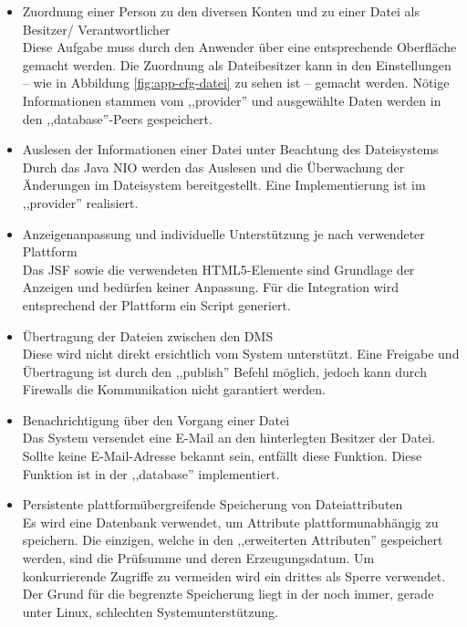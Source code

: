 \documentclass[oneside, ngerman, toc=bibliography,bibliography=totoc,listof=entryprefix, open=right,numbers=noenddot,fontsize=12pt]{scrbook}
\begin{document}
\begin{itemize}
	\item Zuordnung einer Person zu den diversen Konten und zu einer Datei als Besitzer/ Verantwortlicher\\
	Diese Aufgabe muss durch den Anwender über eine entsprechende Oberfläche gemacht werden. Die Zuordnung als Dateibesitzer kann in den Einstellungen -- wie in Abbildung \ref{fig:app-cfg-datei} zu sehen ist -- gemacht werden. Nötige Informationen  stammen vom ,,provider'' und ausgewählte Daten werden in den ,,database''-Peers gespeichert.
	
	\item Auslesen der Informationen einer Datei unter Beachtung des Dateisystems \\
	Durch das Java NIO werden das Auslesen und die Überwachung der Änderungen im Dateisystem bereitgestellt.
    Eine Implementierung ist im ,,provider'' realisiert.

    \item Anzeigenanpassung und individuelle Unterstützung je nach verwendeter Plattform \\
	Das JSF sowie die verwendeten HTML5-Elemente sind Grundlage der Anzeigen und bedürfen keiner Anpassung. Für die Integration wird entsprechend der Plattform ein Script generiert.
	\item Übertragung der Dateien zwischen den DMS\\
   Diese wird nicht direkt ersichtlich  vom System unterstützt. Eine Freigabe und Übertragung ist durch den ,,publish'' Befehl möglich, jedoch kann durch Firewalls die Kommunikation nicht garantiert werden.  
	\item Benachrichtigung über den Vorgang einer Datei\\
	Das System versendet eine E-Mail an den hinterlegten Besitzer der Datei. Sollte keine E-Mail-Adresse bekannt sein, entfällt diese Funktion. Diese Funktion ist in der ,,database'' implementiert.
	\item Persistente plattformübergreifende Speicherung von Dateiattributen\\
	Es wird eine Datenbank verwendet, um Attribute plattformunabhängig zu speichern.
    Die einzigen, welche in den ,,erweiterten Attributen'' gespeichert werden, sind die Prüfsumme und deren Erzeugungsdatum. Um konkurrierende Zugriffe zu vermeiden wird ein drittes als Sperre verwendet. Der Grund für die begrenzte Speicherung liegt in der noch immer, gerade unter Linux, schlechten Systemunterstützung.


\end{itemize}
\end{document}
